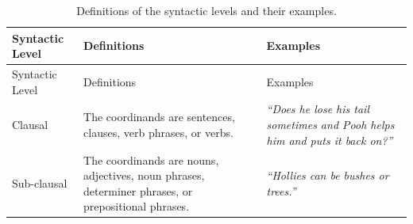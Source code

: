 \documentclass[,man,floatsintext]{apa6}
\begin{document}
\begin{longtable}[]{@{}lll@{}}
\caption{\label{tab:syntacticLevel} Definitions of the syntactic levels and their examples.}\tabularnewline
\toprule
\begin{minipage}[b]{0.17\columnwidth}\raggedright
Syntactic Level\strut
\end{minipage} & \begin{minipage}[b]{0.37\columnwidth}\raggedright
Definitions\strut
\end{minipage} & \begin{minipage}[b]{0.37\columnwidth}\raggedright
Examples\strut
\end{minipage}\tabularnewline
\midrule
\endfirsthead
\toprule
\begin{minipage}[b]{0.17\columnwidth}\raggedright
Syntactic Level\strut
\end{minipage} & \begin{minipage}[b]{0.37\columnwidth}\raggedright
Definitions\strut
\end{minipage} & \begin{minipage}[b]{0.37\columnwidth}\raggedright
Examples\strut
\end{minipage}\tabularnewline
\midrule
\endhead
\begin{minipage}[t]{0.17\columnwidth}\raggedright
Clausal\strut
\end{minipage} & \begin{minipage}[t]{0.37\columnwidth}\raggedright
The coordinands are sentences, clauses, verb phrases, or verbs.\strut
\end{minipage} & \begin{minipage}[t]{0.37\columnwidth}\raggedright
\emph{\enquote{Does he lose his tail sometimes and Pooh helps him and puts it back on?}}\strut
\end{minipage}\tabularnewline
\begin{minipage}[t]{0.17\columnwidth}\raggedright
Sub-clausal\strut
\end{minipage} & \begin{minipage}[t]{0.37\columnwidth}\raggedright
The coordinands are nouns, adjectives, noun phrases, determiner phrases, or prepositional phrases.\strut
\end{minipage} & \begin{minipage}[t]{0.37\columnwidth}\raggedright
\emph{\enquote{Hollies can be bushes or trees.}}\strut
\end{minipage}\tabularnewline
\bottomrule
\end{longtable}
\end{document}
